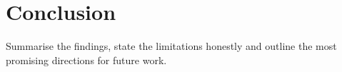 \chapter{Conclusion}
Summarise the findings, state the limitations honestly and outline the
most promising directions for future work.

